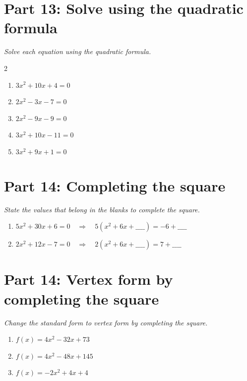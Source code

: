 \documentclass[11pt]{article}
\begin{document}
\section*{Part 13: Solve using the quadratic formula}
\noindent\textit{Solve each equation using the quadratic formula.}
\begin{multicols}{2}
\begin{enumerate}
  \item $3x^{2} + 10x + 4 = 0$
  \vspace{2.8cm}
  \item $2x^{2} - 3x - 7 = 0$
  \vspace{2.8cm}
  \item $2x^{2} - 9x - 9 = 0$
  \vspace{2.8cm}
  \item $3x^{2} + 10x - 11 = 0$
  \vspace{2.8cm}
  \item $3x^{2} + 9x + 1 = 0$
  \vspace{2.8cm}
\end{enumerate}
\end{multicols}

\section*{Part 14: Completing the square}
\noindent\textit{State the values that belong in the blanks to complete the square.}
\begin{enumerate}
  \item $5x^{2} + 30x + 6 = 0 \quad\Rightarrow\quad 5\left(x^{2} + 6x + \_\_\_\_\right) = -6+\_\_\_\_$
  \vspace{2.2cm}
  \item $2x^{2} + 12x - 7 = 0 \quad\Rightarrow\quad 2\left(x^{2} + 6x + \_\_\_\_\right) = 7+\_\_\_\_$
  \vspace{2.2cm}
\end{enumerate}

\section*{Part 14: Vertex form by completing the square}
\noindent\textit{Change the standard form to vertex form by completing the square.}
\begin{enumerate}
  \item $f(x) = 4x^{2} - 32x + 73$
  \vspace{2.6cm}
  \item $f(x) = 4x^{2} - 48x + 145$
  \vspace{2.6cm}
  \item $f(x) = -2x^{2} + 4x + 4$
  \vspace{2.6cm}
\end{enumerate}
\end{document}
